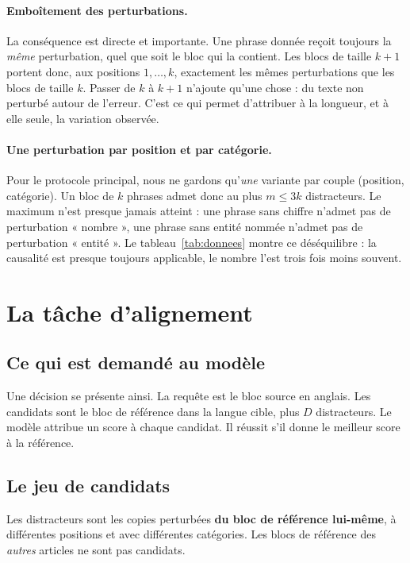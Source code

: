 \documentclass[11pt]{article}
\begin{document}
\paragraph{Emboîtement des perturbations.}
La conséquence est directe et importante.
Une phrase donnée reçoit toujours la \emph{même} perturbation, quel que soit le bloc qui la contient.
Les blocs de taille $k+1$ portent donc, aux positions $1, \dots, k$, exactement les mêmes perturbations que les blocs de taille $k$.
Passer de $k$ à $k+1$ n'ajoute qu'une chose : du texte non perturbé autour de l'erreur.
C'est ce qui permet d'attribuer à la longueur, et à elle seule, la variation observée.

\paragraph{Une perturbation par position et par catégorie.}
Pour le protocole principal, nous ne gardons qu'\emph{une} variante par couple (position, catégorie).
Un bloc de $k$ phrases admet donc au plus $m \le 3k$ distracteurs.
Le maximum n'est presque jamais atteint : une phrase sans chiffre n'admet pas de perturbation « nombre », une phrase sans entité nommée n'admet pas de perturbation « entité ».
Le tableau~\ref{tab:donnees} montre ce déséquilibre : la causalité est presque toujours applicable, le nombre l'est trois fois moins souvent.

\section{La tâche d'alignement}

\subsection{Ce qui est demandé au modèle}

Une décision se présente ainsi.
La requête est le bloc source en anglais.
Les candidats sont le bloc de référence dans la langue cible, plus $D$ distracteurs.
Le modèle attribue un score à chaque candidat.
Il réussit s'il donne le meilleur score à la référence.

\subsection{Le jeu de candidats}

Les distracteurs sont les copies perturbées \textbf{du bloc de référence lui-même}, à différentes positions et avec différentes catégories.
Les blocs de référence des \emph{autres} articles ne sont pas candidats.
\end{document}
